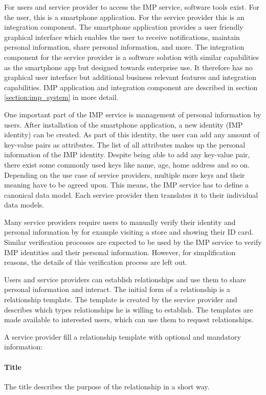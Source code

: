 For users and service provider to access the IMP service, software tools exist. For the user, this is a smartphone application. For the service provider this is an integration component. The smartphone application provides a user friendly graphical interface which enables the user to receive notifications, maintain personal information, share personal information, and more. The integration component for the service provider is a software solution with similar capabilities as the smartphone app but designed towards enterprise use. It therefore has no graphical user interface but additional business relevant features and integration capabilities. IMP application and integration component are described in section \ref{section:imp_system} in more detail.

One important part of the IMP service is management of personal information by users. After installation of the smartphone application, a new identity (IMP identity) can be created. As part of this identity, the user can add any amount of key-value pairs as attributes. The list of all attributes makes up the personal information of the IMP identity. Despite being able to add any key-value pair, there exist some commonly used keys like name, age, home address and so on. Depending on the use case of service providers, multiple more keys and their meaning have to be agreed upon. This means, the IMP service has to define a canonical data model. Each service provider then translates it to their individual data models.

Many service providers require users to manually verify their identity and personal information by for example visiting a store and showing their ID card. Similar verification processes are expected to be used by the IMP service to verify IMP identities and their personal information. However, for simplification reasons, the details of this verification process are left out.

Users and service providers can establish relationships and use them to share personal information and interact. The initial form of a relationship is a relationship template. The template is created by the service provider and describes which types relationships he is willing to establish. The templates are made available to interested users, which can use them to request relationships.

A service provider fill a relationship template with optional and mandatory information:

\paragraph{Title} The title describes the purpose of the relationship in a short way. 
    
